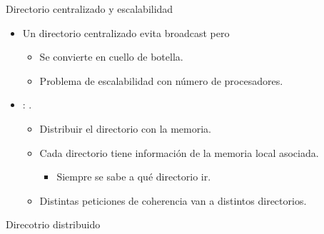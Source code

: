 \begin{frame}[t]{Directorio centralizado y escalabilidad}
\begin{itemize}
  \item Un directorio centralizado evita broadcast pero
    \begin{itemize}
      \item Se convierte en cuello de botella.
      \item Problema de escalabilidad con número de procesadores.
    \end{itemize}

  \item {}: .
    \begin{itemize}
      \item Distribuir el directorio con la memoria.
      \item Cada directorio tiene información de la memoria local asociada.
        \begin{itemize}
          \item Siempre se sabe a qué directorio ir.
        \end{itemize}
      \item Distintas peticiones de coherencia van a distintos directorios.
    \end{itemize}


\end{itemize}
\end{frame}

\begin{frame}{Direcotrio distribuido}
\makebox[\textwidth][c]{

}
\end{frame}
